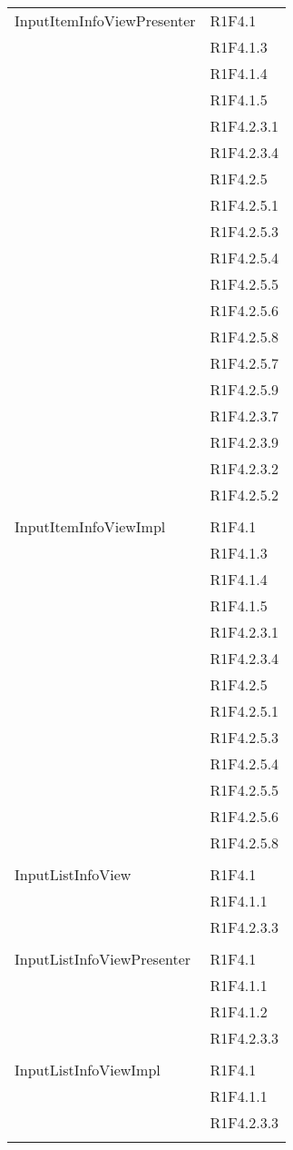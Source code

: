 \begin{center}
\begin{longtable}{|p{7cm}|p{7cm}|}
		InputItemInfoViewPresenter & R1F4.1 \\ & R1F4.1.3 \\ & R1F4.1.4 \\ & R1F4.1.5 \\ & R1F4.2.3.1 \\ & R1F4.2.3.4 \\ & R1F4.2.5 \\ & R1F4.2.5.1 \\ & R1F4.2.5.3 \\ & R1F4.2.5.4 \\ & R1F4.2.5.5 \\ & R1F4.2.5.6 \\ & R1F4.2.5.8 \\ & R1F4.2.5.7 \\ & R1F4.2.5.9 \\ & R1F4.2.3.7 \\ & R1F4.2.3.9 \\ & R1F4.2.3.2 \\ & R1F4.2.5.2 \\ & \\ \hline
		InputItemInfoViewImpl & R1F4.1 \\ & R1F4.1.3 \\ & R1F4.1.4 \\ & R1F4.1.5 \\ & R1F4.2.3.1 \\ & R1F4.2.3.4 \\ & R1F4.2.5 \\ & R1F4.2.5.1 \\ & R1F4.2.5.3 \\ & R1F4.2.5.4 \\ & R1F4.2.5.5 \\ & R1F4.2.5.6 \\ & R1F4.2.5.8 \\ & \\ \hline
		InputListInfoView & R1F4.1 \\ & R1F4.1.1 \\ & R1F4.2.3.3 \\ & \\ \hline
		InputListInfoViewPresenter & R1F4.1 \\ & R1F4.1.1 \\ & R1F4.1.2 \\ & R1F4.2.3.3 \\ & \\ \hline
		InputListInfoViewImpl & R1F4.1 \\ & R1F4.1.1 \\ & R1F4.2.3.3 \\ & \\ \hline

\end{longtable}
\end{center}
